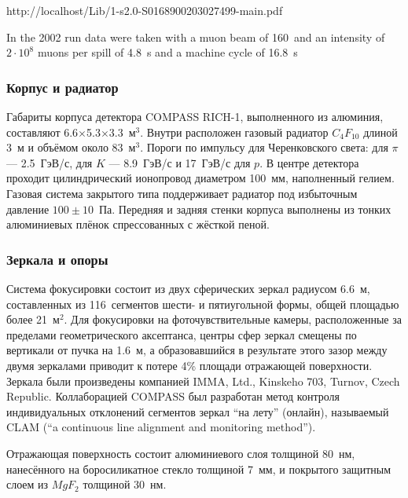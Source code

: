 http://localhost/Lib/1-s2.0-S0168900203027499-main.pdf

In the 2002 run data were taken with a muon beam of 160~\GeVoverC and an intensity of $2 \cdot 10^{8}$ muons per spill of 4.8~s and a machine cycle of 16.8~s

\subsubsection{Корпус и радиатор}

Габариты корпуса детектора COMPASS \mbox{RICH-1}, выполненного из алюминия, составляют 6.6$\times$5.3$\times$3.3~м$^3$. Внутри расположен газовый радиатор $C_{4}F_{10}$ длиной 3~м и объёмом около 83~м$^3$. Пороги по импульсу для Черенковского света: для $\pi$ --- 2.5~ГэВ/с, для $K$ --- 8.9~ГэВ/с и 17~ГэВ/с для $p$. В центре детектора проходит цилиндрический ионопровод диаметром 100~мм, наполненный гелием.
Газовая система закрытого типа поддерживает радиатор под избыточным давление $100\pm10$~Па.
Передняя и задняя стенки корпуса выполнены из тонких алюминиевых плёнок спрессованных с жёсткой пеной. \todo

\subsubsection{Зеркала и опоры}

Система фокусировки состоит из двух сферических зеркал радиусом 6.6~м, составленных из 116~сегментов шести- и пятиугольной формы, общей площадью более 21~м$^2$. Для фокусировки на фоточувствительные камеры, расположенные за пределами геометрического аксептанса, центры сфер зеркал смещены по вертикали от пучка на 1.6~м, а образовавшийся в результате этого зазор между двумя зеркалами приводит к потере 4\% площади отражающей поверхности. Зеркала были произведены компанией IMMA, Ltd., Kinskeho 703, Turnov, Czech Republic.
Коллаборацией COMPASS был разработан метод контроля индивидуальных отклонений сегментов зеркал ``на лету'' (онлайн), называемый CLAM (``a continuous line alignment and monitoring method'').

Отражающая поверхность состоит алюминиевого слоя толщиной 80~нм, нанесённого на боросиликатное стекло толщиной 7~мм, и покрытого защитным слоем из $MgF_{2}$ толщиной 30~нм.

